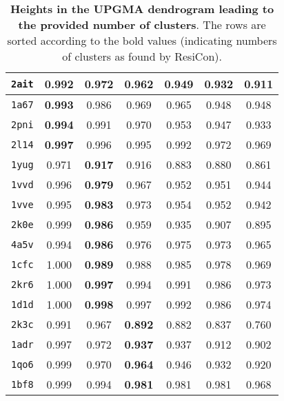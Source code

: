 \documentclass[a4paper,11pt,twoside]{book}%
\begin{document}
\begin{appendices}
\begin{table*}[h!]
\begin{tabular}{cc|c|c|c|c|c}
\multicolumn{1}{c|}{\texttt{2ait}} & {\bf \textsf{0.992}}  & 0.972  & 0.962 & 0.949 & 0.932 & 0.911 \\
\hline
\multicolumn{1}{c|}{\texttt{1a67}} & {\bf \textsf{0.993}}  & 0.986  & 0.969 & 0.965 & 0.948 & 0.948 \\
\multicolumn{1}{c|}{\texttt{2pni}} & {\bf \textsf{0.994}}  & 0.991  & 0.970 & 0.953 & 0.947 & 0.933 \\
\multicolumn{1}{c|}{\texttt{2l14}} & {\bf \textsf{0.997}}  & 0.996  & 0.995 & 0.992 & 0.972 & 0.969 \\
\multicolumn{1}{c|}{\texttt{1yug}} & 0.971  & {\bf \textsf{0.917}}  & 0.916 & 0.883 & 0.880 & 0.861 \\
\multicolumn{1}{c|}{\texttt{1vvd}} & 0.996  & {\bf \textsf{0.979}}  & 0.967 & 0.952 & 0.951 & 0.944 \\
\hline
\multicolumn{1}{c|}{\texttt{1vve}} & 0.995  & {\bf \textsf{0.983}}  & 0.973 & 0.954 & 0.952 & 0.942 \\
\multicolumn{1}{c|}{\texttt{2k0e}} & 0.999  & {\bf \textsf{0.986}}  & 0.959 & 0.935 & 0.907 & 0.895 \\
\multicolumn{1}{c|}{\texttt{4a5v}} & 0.994  & {\bf \textsf{0.986}}  & 0.976 & 0.975 & 0.973 & 0.965 \\
\multicolumn{1}{c|}{\texttt{1cfc}} & 1.000  & {\bf \textsf{0.989}}  & 0.988 & 0.985 & 0.978 & 0.969 \\
\multicolumn{1}{c|}{\texttt{2kr6}} & 1.000  & {\bf \textsf{0.997}}  & 0.994 & 0.991 & 0.986 & 0.973 \\
\hline
\multicolumn{1}{c|}{\texttt{1d1d}} & 1.000  & {\bf \textsf{0.998}}  & 0.997 & 0.992 & 0.986 & 0.974 \\
\multicolumn{1}{c|}{\texttt{2k3c}} & 0.991  & 0.967  & {\bf \textsf{0.892}} & 0.882 & 0.837 & 0.760 \\
\multicolumn{1}{c|}{\texttt{1adr}} & 0.997  & 0.972  & {\bf \textsf{0.937}} & 0.937 & 0.912 & 0.902 \\
\multicolumn{1}{c|}{\texttt{1qo6}} & 0.999  & 0.970  & {\bf \textsf{0.964}} & 0.946 & 0.932 & 0.920 \\
\multicolumn{1}{c|}{\texttt{1bf8}} & 0.999  & 0.994  & {\bf \textsf{0.981}} & 0.981 & 0.981 & 0.968 \\
\end{tabular}
\vspace{.5cm}
\normalfont
\caption{{\bf Heights in the UPGMA dendrogram leading to the provided number of clusters}.
The rows are sorted according to the bold values (indicating numbers of clusters as found by ResiCon).
}
\label{heights}
\end{table*}


\end{appendices}
\end{document}
